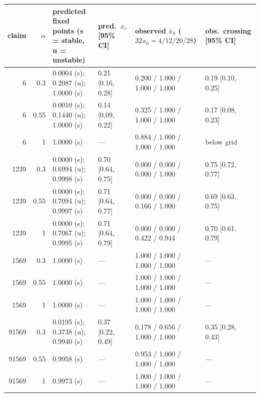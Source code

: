\begin{tabular}{rrllll}
\toprule
claim & $\alpha$ & predicted fixed points (s = stable, u = unstable) & pred.\ $x_c$ [95\% CI] & observed $\bar x_8$ ($32x_0 = 4/12/20/28$) & obs.\ crossing [95\% CI] \\
\midrule
6 & 0.3 & 0.0004 (s); 0.2087 (u); 1.0000 (s) & 0.21 [0.16, 0.28] & 0.200 / 1.000 / 1.000 / 1.000 & 0.19 [0.10, 0.25] \\
6 & 0.55 & 0.0010 (s); 0.1440 (u); 1.0000 (s) & 0.14 [0.09, 0.22] & 0.325 / 1.000 / 1.000 / 1.000 & 0.17 [0.08, 0.23] \\
6 & 1 & 1.0000 (s) & --- & 0.884 / 1.000 / 1.000 / 1.000 & below grid \\
1239 & 0.3 & 0.0000 (s); 0.6994 (u); 0.9998 (s) & 0.70 [0.64, 0.75] & 0.000 / 0.000 / 0.000 / 1.000 & 0.75 [0.72, 0.77] \\
1239 & 0.55 & 0.0000 (s); 0.7094 (u); 0.9997 (s) & 0.71 [0.64, 0.77] & 0.000 / 0.000 / 0.166 / 1.000 & 0.69 [0.63, 0.75] \\
1239 & 1 & 0.0000 (s); 0.7067 (u); 0.9995 (s) & 0.71 [0.64, 0.79] & 0.000 / 0.000 / 0.422 / 0.944 & 0.70 [0.61, 0.79] \\
1569 & 0.3 & 1.0000 (s) & --- & 1.000 / 1.000 / 1.000 / 1.000 & --- \\
1569 & 0.55 & 1.0000 (s) & --- & 1.000 / 1.000 / 1.000 / 1.000 & --- \\
1569 & 1 & 1.0000 (s) & --- & 1.000 / 1.000 / 1.000 / 1.000 & --- \\
91569 & 0.3 & 0.0195 (s); 0.3738 (u); 0.9940 (s) & 0.37 [0.22, 0.49] & 0.178 / 0.656 / 1.000 / 1.000 & 0.35 [0.28, 0.43] \\
91569 & 0.55 & 0.9958 (s) & --- & 0.953 / 1.000 / 1.000 / 1.000 & --- \\
91569 & 1 & 0.9973 (s) & --- & 1.000 / 1.000 / 1.000 / 1.000 & --- \\
\bottomrule
\end{tabular}
